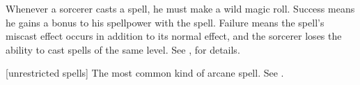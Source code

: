  Whenever a sorcerer casts a spell, he must make a wild magic roll.
Success means he gains a bonus to his spellpower with the spell.
Failure means the spell's miscast effect occurs in addition to its normal effect, and the sorcerer loses the ability to cast spells of the same level.
See , for details.

[unrestricted spells] The most common kind of arcane spell. See .
